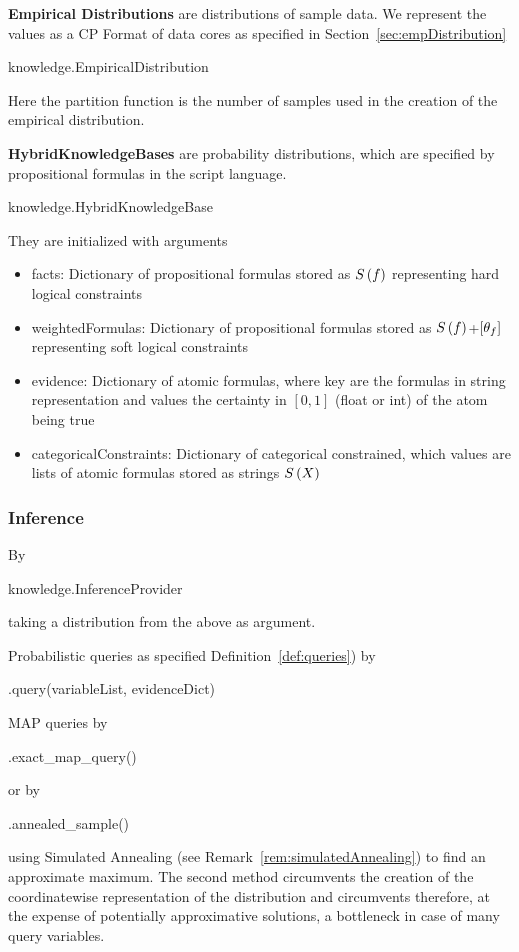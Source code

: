 \textbf{Empirical Distributions} are distributions of sample data.
We represent the values as a CP Format of data cores as specified in Section~\ref{sec:empDistribution}
\begin{centeredcode}
	knowledge.EmpiricalDistribution
\end{centeredcode}
Here the partition function is the number of samples used in the creation of the empirical distribution.


\textbf{HybridKnowledgeBases} are probability distributions, which are specified by propositional formulas in the script language.
\begin{centeredcode}
	knowledge.HybridKnowledgeBase
\end{centeredcode}
They are initialized with arguments
\begin{itemize}
	\item facts: Dictionary of propositional formulas stored as $S\left(f\right)$ representing hard logical constraints
	\item weightedFormulas: Dictionary of propositional formulas stored as $S\left(f\right)$+$[\theta_{f}]$ representing soft logical constraints
	\item evidence: Dictionary of atomic formulas, where key are the formulas in string representation and values the certainty in $[0,1]$ (float or int) of the atom being true
	\item categoricalConstraints: Dictionary of categorical constrained, which values are lists of atomic formulas stored as strings $S\left(X\right)$
\end{itemize}


\subsubsection{Inference}

By
\begin{centeredcode}
	knowledge.InferenceProvider
\end{centeredcode}
taking a distribution from the above as argument.

Probabilistic queries as specified Definition~\ref{def:queries})  by 
\begin{centeredcode}
	.query(variableList, evidenceDict)
\end{centeredcode}

MAP queries by
\begin{centeredcode}
	.exact\_map\_query()
\end{centeredcode}
or by
\begin{centeredcode}
	.annealed\_sample()
\end{centeredcode}
using Simulated Annealing (see Remark~\ref{rem:simulatedAnnealing}) to find an approximate maximum.
The second method circumvents the creation of the coordinatewise representation of the distribution and circumvents therefore, at the expense of potentially approximative solutions, a bottleneck in case of many query variables.


